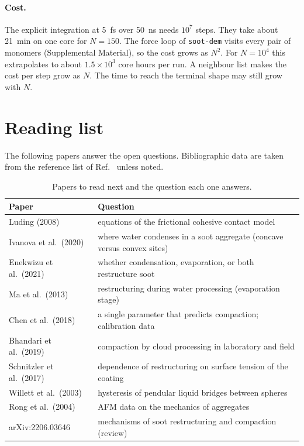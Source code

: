 \documentclass[11pt,a4paper]{article}
\begin{document}
\paragraph{Cost.}
The explicit integration at \SI{5}{\femto\second} over \SI{50}{\nano\second} needs $10^7$ steps.
They take about \SI{21}{\minute} on one core for $N = 150$.
The force loop of \texttt{soot-dem} visits every pair of monomers (Supplemental Material), so the cost grows as $N^2$.
For $N = 10^4$ this extrapolates to about $1.5 \times 10^3$ core hours per run.
A neighbour list makes the cost per step grow as $N$.
The time to reach the terminal shape may still grow with $N$.

\section{Reading list}
\label{sec:reading}

The following papers answer the open questions.
Bibliographic data are taken from the reference list of Ref.~\cite{demidov2024} unless noted.

\begin{table}[htbp]
  \centering
  \caption{Papers to read next and the question each one answers.}
  \label{tab:reading}
  \small
  \begin{tabular}{>{\raggedright\arraybackslash}p{58mm}>{\raggedright\arraybackslash}p{88mm}}
    \toprule
    Paper & Question \\
    \midrule
    Luding (2008)~\cite{luding2008} & equations of the frictional cohesive contact model \\
    Ivanova et al.\ (2020)~\cite{ivanova2020} & where water condenses in a soot aggregate (concave versus convex sites) \\
    Enekwizu et al.\ (2021)~\cite{enekwizu2021} & whether condensation, evaporation, or both restructure soot \\
    Ma et al.\ (2013)~\cite{ma2013} & restructuring during water processing (evaporation stage) \\
    Chen et al.\ (2018)~\cite{chen2018} & a single parameter that predicts compaction; calibration data \\
    Bhandari et al.\ (2019)~\cite{bhandari2019} & compaction by cloud processing in laboratory and field \\
    Schnitzler et al.\ (2017)~\cite{schnitzler2017} & dependence of restructuring on surface tension of the coating \\
    Willett et al.\ (2003)~\cite{willett2003} & hysteresis of pendular liquid bridges between spheres \\
    Rong et al.\ (2004)~\cite{rong2004} & AFM data on the mechanics of aggregates \\
    arXiv:2206.03646~\cite{arxiv2206} & mechanisms of soot restructuring and compaction (review) \\
    \bottomrule
  \end{tabular}
\end{table}
\end{document}
